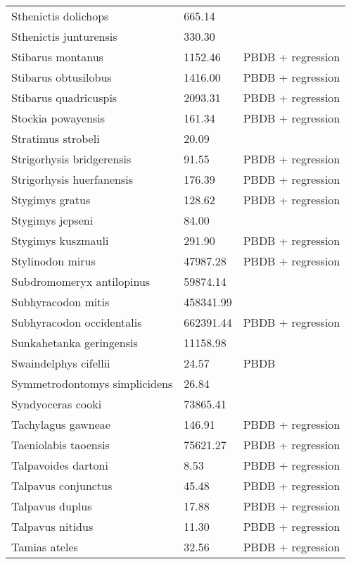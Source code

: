 \documentclass{article}
\begin{document}
\begin{center}
\begin{longtable}{p{} p{} p{}}
    Sthenictis dolichops & 665.14 & \cite{Tomiya2013} \\ 
    Sthenictis junturensis & 330.30 & \cite{Tomiya2013} \\ 
    Stibarus montanus & 1152.46 & PBDB + regression \\ 
    Stibarus obtusilobus & 1416.00 & PBDB + regression \\ 
    Stibarus quadricuspis & 2093.31 & PBDB + regression \\ 
    Stockia powayensis & 161.34 & PBDB + regression \\ 
    Stratimus strobeli & 20.09 & \cite{Tomiya2013} \\ 
    Strigorhysis bridgerensis & 91.55 & PBDB + regression \\ 
    Strigorhysis huerfanensis & 176.39 & PBDB + regression \\ 
    Stygimys gratus & 128.62 & PBDB + regression \\ 
    Stygimys jepseni & 84.00 & \cite{Wilson2012} \\ 
    Stygimys kuszmauli & 291.90 & PBDB + regression \\ 
    Stylinodon mirus & 47987.28 & PBDB + regression \\ 
    Subdromomeryx antilopinus & 59874.14 & \cite{Tomiya2013} \\ 
    Subhyracodon mitis & 458341.99 & \cite{Scott1940} \\ 
    Subhyracodon occidentalis & 662391.44 & PBDB + regression \\ 
    Sunkahetanka geringensis & 11158.98 & \cite{Tomiya2013} \\ 
    Swaindelphys cifellii & 24.57 & PBDB \\ 
    Symmetrodontomys simplicidens & 26.84 & \cite{Tomiya2013} \\ 
    Syndyoceras cooki & 73865.41 & \cite{Tomiya2013} \\ 
    Tachylagus gawneae & 146.91 & PBDB + regression \\ 
    Taeniolabis taoensis & 75621.27 & PBDB + regression \\ 
    Talpavoides dartoni & 8.53 & PBDB + regression \\ 
    Talpavus conjunctus & 45.48 & PBDB + regression \\ 
    Talpavus duplus & 17.88 & PBDB + regression \\ 
    Talpavus nitidus & 11.30 & PBDB + regression \\ 
    Tamias ateles & 32.56 & PBDB + regression \\ 

\end{longtable}
\end{center}
\end{document}
